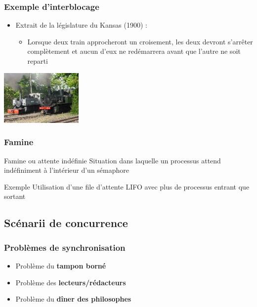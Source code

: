 \begin{frame}
\frametitle{Exemple d'interblocage}
\begin{itemize}
\item Extrait de la législature du Kansas (1900) :
\begin{itemize}
\item Lorsque deux train approcheront un croisement, les deux devront s'arrêter complètement et aucun d'eux ne redémarrera avant que l'autre ne soit reparti
\end{itemize}
\end{itemize}
\begin{flushright}
\includegraphics[width=4cm]{../illustration/trains.png}
\end{flushright}
\end{frame}

\begin{frame}
\frametitle{Famine}
\begin{block}{Famine ou attente indéfinie}
Situation dans laquelle un processus attend indéfiniment à l’intérieur d’un sémaphore
\end{block}
\begin{exampleblock}{Exemple}
Utilisation d’une file d’attente LIFO avec plus de processus entrant que sortant
\end{exampleblock}
\end{frame}

\subsection{Scénarii de concurrence}

\begin{frame}
\frametitle{Problèmes de synchronisation}
\begin{itemize}
\item Problème du \textbf{tampon borné}
\item Problème des \textbf{lecteurs/rédacteurs}
\item Problème du \textbf{dîner des philosophes}
\end{itemize}
\end{frame}

